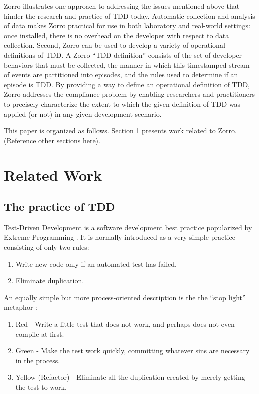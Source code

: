 \documentclass[smallextended]{svjour3}     %
\begin{document}
Zorro illustrates one approach to addressing the issues mentioned above
that hinder the research and practice of TDD today.  Automatic collection
and analysis of data makes Zorro practical for use in both laboratory and
real-world settings: once installed, there is no overhead on the developer
with respect to data collection.  Second, Zorro can be used to develop a
variety of operational definitions of TDD. A Zorro ``TDD definition''
consists of the set of developer behaviors that must be collected, the
manner in which this timestamped stream of events are partitioned into
episodes, and the rules used to determine if an episode is TDD.  By
providing a way to define an operational definition of TDD, Zorro addresses
the compliance problem by enabling researchers and practitioners to
precisely characterize the extent to which the given definition of TDD was
applied (or not) in any given development scenario.

This paper is organized as follows.  Section \ref{sec:RelatedWork} presents
work related to Zorro.  (Reference other sections here).

\section{Related Work}
\label{sec:RelatedWork}

\subsection{The practice of TDD}

Test-Driven Development \citep{Beck:03} is a software development 
best practice popularized by Extreme Programming \citep{Jeffries:00,Beck:00}. 
It is normally introduced as a very simple practice consisting of only two rules:

\begin{enumerate}
\item Write new code only if an automated test has failed.
\item Eliminate duplication.
\end{enumerate} 

An equally simple but more process-oriented description is the the 
``stop light'' metaphor \citep{Beck:03}: 
\begin{enumerate}
\item Red - Write a little test that does not work, and perhaps does not even compile at first.
\item Green - Make the test work quickly, committing whatever sins are necessary in the process.
\item Yellow (Refactor) - Eliminate all the duplication created by merely getting the test to work.
\end{enumerate}
\end{document}
